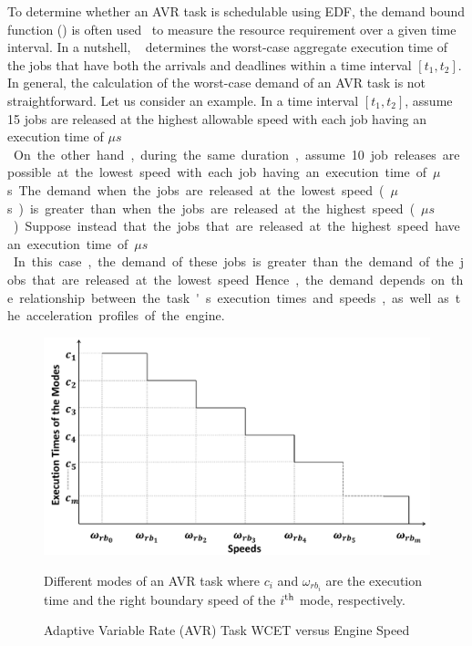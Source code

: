 To determine whether an AVR task is schedulable using EDF, the demand bound function (\dbf) is often used~\cite{biondi_response-time_2015,biondi_feasibility_2015} to measure the resource requirement over a given time interval. In a nutshell, \dbf~ determines the worst-case aggregate execution time of the jobs that have both the arrivals and deadlines within a time interval $[t_1,t_2]$.
In general, the calculation of the worst-case demand of an AVR task is not straightforward.
Let us consider an example.
In a time interval $[t_1,t_2]$, assume 15 jobs are released at the highest allowable speed with each job having an execution time of \unit[50]{$\mu s$}.
On the other hand, during the same duration, assume 10 job releases are possible at the lowest speed with each job having an execution time of \unit[100]{$\mu$s}.
The demand when the jobs are released at the lowest speed (\unit[1,000]{$\mu$s}) is greater than when the jobs are released at the highest speed (\unit[750]{$\mu s$}).
Suppose instead that the jobs that are released at the highest speed have an execution time of \unit[70]{$\mu s$}.
In this case, the demand of these jobs is greater than the demand of the jobs that are released at the lowest speed. 
Hence, the demand depends on the relationship between the task's execution times and speeds, as well as the acceleration profiles of the engine.  

\begin{figure}
\centering
\includegraphics[width=\linewidth]{fig/AVRImage.pdf}
\caption{Adaptive Variable Rate (AVR) Task WCET versus Engine Speed}Different modes of an AVR task where $c_i$ and $\omega_{rb_i}$ are the execution time and the right boundary speed of the $i^{\rm th}$ mode, respectively.
\label{fig:AVRImage}
\end{figure}

